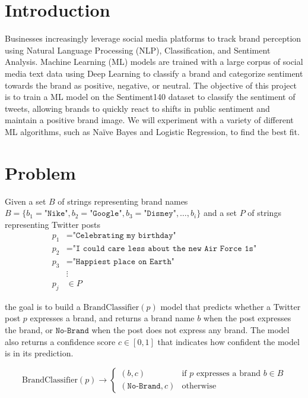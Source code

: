 \documentclass{article}
\begin{document}

\section*{Introduction}

    \noindent Businesses increasingly leverage social media platforms to track brand perception using Natural Language Processing (NLP), Classification, and Sentiment Analysis. Machine Learning (ML) models are trained with a large corpus of social media text data using Deep Learning to classify a brand and categorize sentiment towards the brand as positive, negative, or neutral. The objective of this project is to train a ML model on the Sentiment140 dataset to classify the sentiment of tweets, allowing brands to quickly react to shifts in public sentiment and maintain a positive brand image. We will experiment with a variety of different ML algorithms, such as Naïve Bayes and Logistic Regression, to find the best fit.

\section*{Problem}

Given a set $B$ of strings representing brand names $B = \{b_1 =
    \texttt{"Nike"}, b_2 = \texttt{"Google"}, b_3 = \texttt{"Disney"}, \ldots,
    b_i\}$ and a set $P$ of strings representing Twitter posts
\begin{align*}
    p_1 & = \texttt{"Celebrating my birthday"}                      \\
    p_2 & = \texttt{"I could care less about the new Air Force 1s"} \\
    p_3 & = \texttt{"Happiest place on Earth"}                      \\
        & \vdots                                                    \\
    p_j & \in P
\end{align*}

the goal is to build a $\mathrm{BrandClassifier}(p)$ model that predicts
whether a
Twitter post $p$ expresses a brand, and returns a brand name $b$ when the
post expresses the brand, or $\texttt{No-Brand}$ when the post does not express
any brand. The model also returns a confidence score $c \in [0, 1]$ that
indicates how confident the model is in its prediction.

\[
    \mathrm{BrandClassifier}(p) \rightarrow \begin{cases}
        (b, c)                 & \text{if } p \text{ expresses a brand } b \in
        B
        \\
        (\texttt{No-Brand}, c) & \text{otherwise}
    \end{cases}
\]
\end{document}
